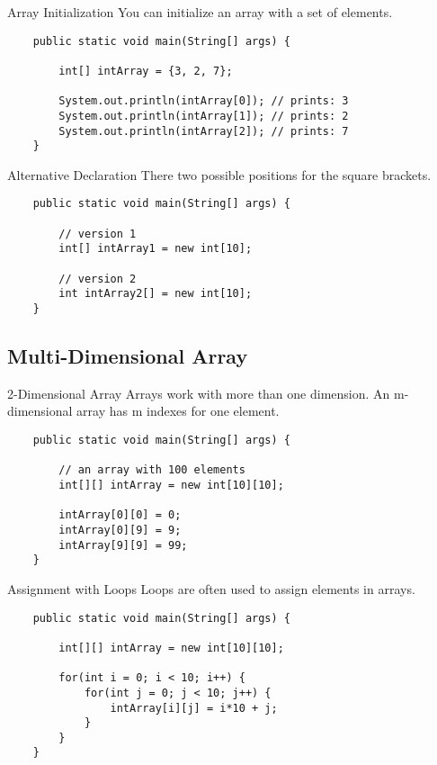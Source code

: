 \begin{frame}[fragile]{Array Initialization} %
	You can initialize an array with a set of elements.
	\begin{lstlisting}
	public static void main(String[] args) {
	
	    int[] intArray = {3, 2, 7};
	    
	    System.out.println(intArray[0]); // prints: 3
	    System.out.println(intArray[1]); // prints: 2
	    System.out.println(intArray[2]); // prints: 7
	}
	\end{lstlisting}
\end{frame}

\begin{frame}[fragile]{Alternative Declaration}
	There two possible positions for the square brackets. 
	\begin{lstlisting}
	public static void main(String[] args) {

	    // version 1	
	    int[] intArray1 = new int[10];
	    
	    // version 2
	    int intArray2[] = new int[10];
	}
	\end{lstlisting}
\end{frame}

\subsection{Multi-Dimensional Array}
\begin{frame}[fragile]{2-Dimensional Array}
	Arrays work with more than one dimension. 
	An m-dimensional array has m indexes for one element.
	\begin{lstlisting}
	public static void main(String[] args) {

	    // an array with 100 elements
	    int[][] intArray = new int[10][10];
	    
	    intArray[0][0] = 0;
	    intArray[0][9] = 9;
	    intArray[9][9] = 99;
	}
	\end{lstlisting}
\end{frame}

\begin{frame}[fragile]{Assignment with Loops}
	Loops are often used to assign elements in arrays.
	\begin{lstlisting}
	public static void main(String[] args) {

	    int[][] intArray = new int[10][10];
	    
	    for(int i = 0; i < 10; i++) {
	        for(int j = 0; j < 10; j++) {
	            intArray[i][j] = i*10 + j;
	        }
	    }
	}
	\end{lstlisting}
\end{frame}


